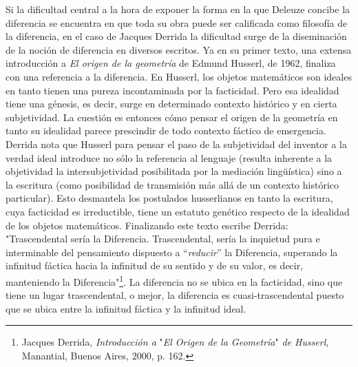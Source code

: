 \documentclass{book}
\begin{document}
Si la dificultad central a la hora de exponer la forma en la que Deleuze
concibe la diferencia se encuentra en que toda su obra puede ser
calificada como filosofía de la diferencia, en el caso de Jacques
Derrida la dificultad surge de la diseminación de la noción de
diferencia en diversos escritos. Ya en su primer texto, una extensa
introducción a \emph{El origen de la geometría} de Edmund Husserl, de
1962, finaliza con una referencia a la diferencia. En Husserl, los
objetos matemáticos son ideales en tanto tienen una pureza incontaminada
por la facticidad. Pero esa idealidad tiene una génesis, es decir, surge
en determinado contexto histórico y en cierta subjetividad. La cuestión
es entonces cómo pensar el origen de la geometría en tanto su idealidad
parece prescindir de todo contexto fáctico de emergencia. Derrida nota
que Husserl para pensar el paso de la subjetividad del inventor a la
verdad ideal introduce no sólo la referencia al lenguaje (resulta
inherente a la objetividad la intersubjetividad posibilitada por la
mediación lingüística) sino a la escritura (como posibilidad de
transmisión más allá de un contexto histórico particular). Esto
desmantela los postulados husserlianos en tanto la escritura, cuya
facticidad es irreductible, tiene un estatuto genético respecto de la
idealidad de los objetos matemáticos. Finalizando este texto escribe
Derrida: "Trascendental sería la Diferencia. Trascendental, sería la
inquietud pura e interminable del pensamiento dispuesto a
``\emph{reducir}'' la Diferencia, superando la infinitud fáctica hacia
la infinitud de su sentido y de su valor, es decir, manteniendo la
Diferencia"\footnote{Jacques Derrida, \emph{Introducción a} "\emph{El
  Origen de la Geometría}" \emph{de Husserl}, Manantial, Buenos Aires,
  2000, p. 162.}. La diferencia no se ubica en la facticidad, sino que
tiene un lugar trascendental, o mejor, la diferencia es
cuasi-trascendental puesto que se ubica entre la infinitud fáctica y la
infinitud ideal.
\end{document}

